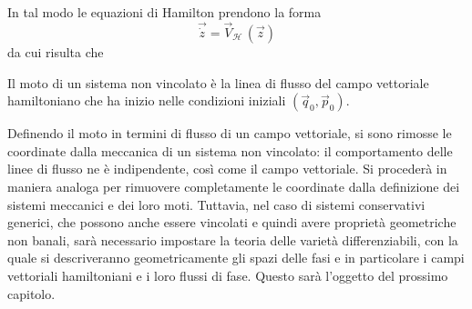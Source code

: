 In tal modo le equazioni di Hamilton prendono la forma \begin{equation}
\vec{\dot{z}} = \vec{V}_{\mathcal{H}}\, (\vec{z}) 
\end{equation} 
da cui risulta che
\begin{theorem}
  Il moto di un sistema non vincolato è la linea di flusso del campo vettoriale hamiltoniano che ha inizio nelle condizioni iniziali $(\vec{q}_0, \vec{p}_0)$.
\end{theorem} 

Definendo il moto in termini di flusso di un campo vettoriale, si sono rimosse le coordinate dalla meccanica di un sistema non vincolato: il comportamento delle linee di flusso ne è indipendente, così come il campo vettoriale. Si procederà in maniera analoga per rimuovere completamente le coordinate dalla definizione dei sistemi meccanici e dei loro moti. Tuttavia, nel caso di sistemi conservativi generici, che possono anche essere vincolati e quindi avere proprietà geometriche non banali, sarà necessario impostare la teoria delle varietà differenziabili, con la quale si descriveranno geometricamente gli spazi delle fasi e in particolare i campi vettoriali hamiltoniani e i loro flussi di fase. Questo sarà l'oggetto del prossimo capitolo. 